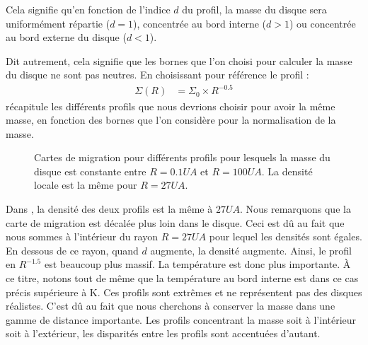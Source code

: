 Cela signifie qu'en fonction de l'indice $d$ du profil, la masse du disque sera uniformément répartie ($d=1$), concentrée au bord interne ($d>1$) ou concentrée au bord externe du disque ($d<1$). 

Dit autrement, cela signifie que les bornes que l'on choisi pour calculer la masse du disque ne sont pas neutres. En choisissant pour référence le profil : 
\begin{align}
\Sigma(R) &= \Sigma_0 \times R^{-0.5}
\end{align}
 récapitule les différents profils que nous devrions choisir pour avoir la même masse, en fonction des bornes que l'on considère pour la normalisation de la masse. 

\begin{figure}[htbp]
\centering
{}\hfill
{}

\caption{Cartes de migration pour différents profils pour lesquels la masse du disque est constante entre $R=0.1\unit{UA}$ et $R=100\unit{UA}$. La densité locale est la même pour  $R=27\unit{UA}$. }\label{fig:map_mtot_01_100}
\end{figure}

Dans , la densité des deux profils est la même à $27\unit{UA}$. Nous remarquons que la carte de migration est décalée plus loin dans le disque. Ceci est dû au fait que nous sommes à l'intérieur du rayon $R=27\unit{UA}$ pour lequel les densités sont égales. En dessous de ce rayon, quand $d$ augmente, la densité augmente. Ainsi, le profil en $R^{-1.5}$ est beaucoup plus massif. La température est donc plus importante. À ce titre, notons tout de même que la température au bord interne est dans ce cas précis supérieure à  K. Ces profils sont extrêmes et ne représentent pas des disques réalistes. C'est dû au fait que nous cherchons à conserver la masse dans une gamme de distance importante. Les profils concentrant la masse soit à l'intérieur soit à l'extérieur, les disparités entre les profils sont accentuées d'autant. 

